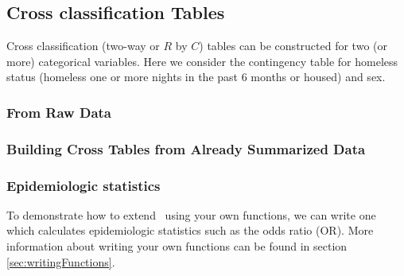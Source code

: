 \subsection{Cross classification Tables}

Cross classification (two-way or $R$ by $C$) tables can be constructed for
two (or more) categorical variables.  Here we consider the contingency table
for homeless status (homeless one or more nights in the past 6 months or housed) 
and sex.

\subsubsection{From Raw Data}
\begin{knitrout}
\end{knitrout}


\subsubsection{Building Cross Tables from Already Summarized Data}


\subsubsection{Epidemiologic statistics}
\label{sec:epistats}

To demonstrate how to extend \R\ using your own functions, we can write
one which calculates epidemiologic statistics such as the odds ratio (OR).
More information about writing your own functions can be found in 
section
\ref{sec:writingFunctions}.

